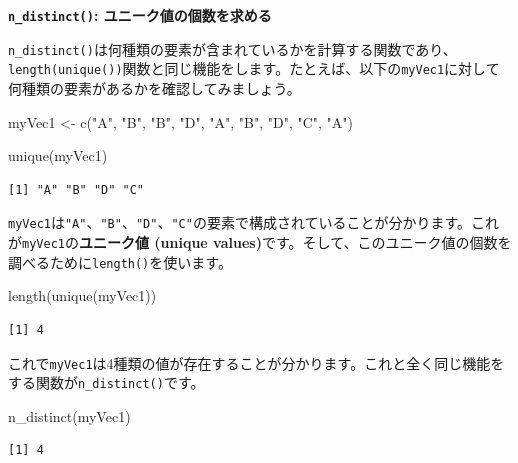 \documentclass[
  a4paper,
  pandoc,
  ja=standard,
  jafont=haranoaji]{bxjsbook}
\newenvironment{Shaded}{\begin{snugshade}}{\end{snugshade}}
\newcommand{\FunctionTok}[1]{\textcolor[rgb]{0.28,0.35,0.67}{#1}}
\newcommand{\NormalTok}[1]{\textcolor[rgb]{0.00,0.48,0.65}{#1}}
\newcommand{\OtherTok}[1]{\textcolor[rgb]{0.00,0.48,0.65}{#1}}
\newcommand{\StringTok}[1]{\textcolor[rgb]{0.13,0.47,0.30}{#1}}
\begin{document}
\textbf{\texttt{n\_distinct()}: ユニーク値の個数を求める}

\texttt{n\_distinct()}は何種類の要素が含まれているかを計算する関数であり、\texttt{length(unique())}関数と同じ機能をします。たとえば、以下の\texttt{myVec1}に対して何種類の要素があるかを確認してみましょう。

\begin{Shaded}
\begin{Highlighting}[numbers=left,,]
\NormalTok{myVec1 }\OtherTok{\textless{}{-}} \FunctionTok{c}\NormalTok{(}\StringTok{"A"}\NormalTok{, }\StringTok{"B"}\NormalTok{, }\StringTok{"B"}\NormalTok{, }\StringTok{"D"}\NormalTok{, }\StringTok{"A"}\NormalTok{, }\StringTok{"B"}\NormalTok{, }\StringTok{"D"}\NormalTok{, }\StringTok{"C"}\NormalTok{, }\StringTok{"A"}\NormalTok{)}

\FunctionTok{unique}\NormalTok{(myVec1)}
\end{Highlighting}
\end{Shaded}

\begin{verbatim}
[1] "A" "B" "D" "C"
\end{verbatim}

\texttt{myVec1}は\texttt{"A"}、\texttt{"B"}、\texttt{"D"}、\texttt{"C"}の要素で構成されていることが分かります。これが\texttt{myVec1}の\textbf{ユニーク値
(unique
values)}です。そして、このユニーク値の個数を調べるために\texttt{length()}を使います。

\begin{Shaded}
\begin{Highlighting}[numbers=left,,]
\FunctionTok{length}\NormalTok{(}\FunctionTok{unique}\NormalTok{(myVec1))}
\end{Highlighting}
\end{Shaded}

\begin{verbatim}
[1] 4
\end{verbatim}

これで\texttt{myVec1}は4種類の値が存在することが分かります。これと全く同じ機能をする関数が\texttt{n\_distinct()}です。

\begin{Shaded}
\begin{Highlighting}[numbers=left,,]
\FunctionTok{n\_distinct}\NormalTok{(myVec1)}
\end{Highlighting}
\end{Shaded}

\begin{verbatim}
[1] 4
\end{verbatim}
\end{document}
